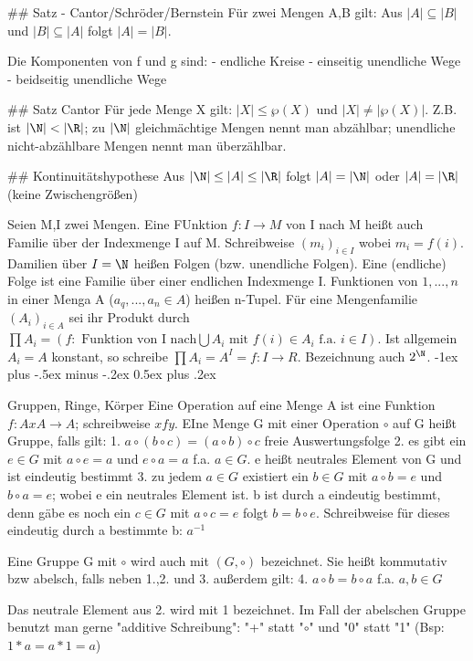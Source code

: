 \documentclass[10pt,landscape]{article}
\makeatletter
\renewcommand{\section}{\@startsection{section}{1}{0mm}%
                                {-1ex plus -.5ex minus -.2ex}%
                                {0.5ex plus .2ex}%
                                {\normalfont\large\bfseries}}
\makeatother
\begin{document}
\begin{multicols}{3}
{## Satz - Cantor/Schröder/Bernstein
Für zwei Mengen A,B gilt: Aus $|A|\subseteq |B|$ und $|B| \subseteq |A|$ folgt $|A| = |B|$.

Die Komponenten von f und g sind:
- endliche Kreise
- einseitig unendliche Wege
- beidseitig unendliche Wege

## Satz Cantor
Für jede Menge X gilt: $|X|\leq \wp(X)$ und $|X|\not = |\wp (X)|$. Z.B. ist $|\N|<|\R|$; zu $|\N|$ gleichmächtige Mengen nennt man abzählbar; unendliche nicht-abzählbare Mengen nennt man überzählbar.

## Kontinuitätshypothese
Aus $|\N|\leq |A| \leq |\R|$ folgt $|A|=|\N|$ oder $|A|=|\R|$ (keine Zwischengrößen)

Seien M,I zwei Mengen. Eine FUnktion $f:I\rightarrow M$ von I nach M heißt auch Familie über der Indexmenge I auf M. Schreibweise $(m_i)_{i\in I}$ wobei $m_i=f(i)$. Damilien über $I=\N$ heißen Folgen (bzw. unendliche Folgen).
Eine (endliche) Folge ist eine Familie über einer endlichen Indexmenge I. Funktionen von ${1,...,n}$ in einer Menga A ($a_q,...,a_n\in A$) heißen n-Tupel. Für eine Mengenfamilie $(A_i)_{i\in A}$ sei ihr Produkt durch $\prod A_i=(f: \text{ Funktion von I nach}\bigcup A_i \text{ mit } f(i)\in A_i \text{ f.a. } i\in I)$. Ist allgemein $A_i=A$ konstant, so schreibe $\prod A_i=A^I={f:I\rightarrow R}$. Bezeichnung auch $2^{\N}$.
\section{Gruppen, Ringe, Körper
Eine Operation auf eine Menge A ist eine Funktion $f:AxA\rightarrow A$; schreibweise $xfy$. EIne Menge G mit einer Operation $\circ$ auf G heißt Gruppe, falls gilt:
1. $a\circ (b\circ c) = (a\circ b)\circ c$ freie Auswertungsfolge
2. es gibt ein $e\in G$ mit $a\circ e=a$ und $e\circ a=a$ f.a. $a\in G$. e heißt neutrales Element von G und ist eindeutig bestimmt
3. zu jedem $a\in G$ existiert ein $b\in G$ mit $a\circ b=e$ und $b\circ a=e$; wobei e ein neutrales Element ist. b ist durch a eindeutig bestimmt, denn gäbe es noch ein $c\in G$ mit $a\circ c=e$ folgt $b=b\circ e$. Schreibweise für dieses eindeutig durch a bestimmte b: $a^{-1}$

Eine Gruppe G mit $\circ$ wird auch mit $(G, \circ)$ bezeichnet. Sie heißt kommutativ bzw abelsch, falls neben 1.,2. und 3. außerdem gilt:
4. $a\circ b = b\circ a$ f.a. $a,b \in G$

Das neutrale Element aus 2. wird mit 1 bezeichnet. Im Fall der abelschen Gruppe benutzt man gerne "additive Schreibung": "+" statt "$\circ$" und "0" statt "1" (Bsp: $1*a = a*1 = a$)

}}
\end{multicols}
\end{document}
